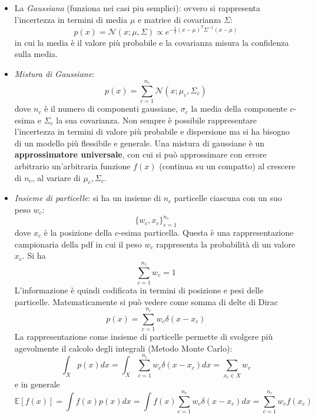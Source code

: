 \begin{itemize}
\item La \textit{Gaussiana} (funziona nei casi piu semplici): ovvero si rappresenta l'incertezza in termini di media $\mu$ e matrice di covarianza $\Sigma$:
\begin{equation}
p(x) = \mathcal{N}(x; \mu, \Sigma) \propto e^{-\frac{1}{2} (x-\mu)^T \Sigma^{-1} (x- \mu)}
\end{equation}
in cui la media \`e il valore pi\`u probabile e la covarianza misura la confidenza sulla media.

\item \textit{Mistura di Gaussiane}:
    \begin{equation}
    p(x) = \sum_{c=1}^{n_c} \mathcal{N}(x; \mu_c, \Sigma_c)
    \end{equation} 
    dove $n_c$ \`e il numero di componenti gaussiane, $\sigma_c$ la media della componente $c$-esima e $\Sigma_c$ la sua covarianza. Non sempre \`e possibile rappresentare l'incertezza in termini di valore pi\`u probabile e dispersione ma si ha bisogno di un modello pi\`u flessibile e generale. Una mistura di gaussiane \`e un \textbf{approssimatore universale}, con cui si pu\`o approssimare con errore arbitrario un'arbitraria funzione $f(x)$ (continua su un compatto) al crescere di $n_c$, al variare di $\mu_c, \Sigma_c$.

\item \textit{Insieme di particelle}: si ha un insieme di $n_c$ particelle ciascuna con un suo peso $w_c$:
    \begin{equation}
    \{w_c, x_c \}_{c=1}^{n_c}
    \end{equation}
    dove $x_c$ \`e la posizione della $c$-esima particella. Questa \`e una rappresentazione campionaria della pdf in cui il peso $w_c$ rappresenta la probabilit\`a di un valore $x_c$. Si ha
    \begin{equation}
    \sum_{c=1}^{n_c} w_c = 1
    \end{equation}
    L'informazione \`e quindi codificata in termini di posizione e pesi delle particelle. Matematicamente si pu\`o vedere come somma di delte di Dirac
    \begin{equation}
    p(x) = \sum_{c=1}^{n_c} w_c \delta (x - x_c)
    \end{equation} La rappresentazione come insieme di particelle permette di svolgere pi\`u agevolmente il calcolo degli integrali (Metodo Monte Carlo):
    \begin{equation}
    \int_X p(x) dx = \int_X \sum_{c=1}^{n_c} w_c \delta(x-x_c) dx = \sum_{x_c \in X} w_c
    \end{equation} e in generale
    \begin{equation}
    \mathbb{E} [f(x)] = \int f(x) p(x) dx = \int f(x) \sum_{c=1}^{n_c} w_c \delta (x - x_c) dx = \sum_{c=1}^{n_c} w_c f(x_c)
    \end{equation}
\end{itemize}

